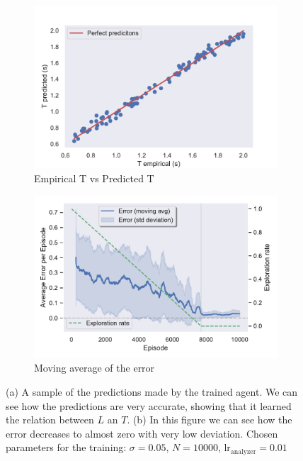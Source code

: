 \documentclass[11pt,a4paper,twoside]{report}
\newcommand{\+}{\textnormal{+} }
\theoremstyle{definition}
\numberwithin{equation}{chapter}
\begin{document}
  \begin{figure}[]
  \centering
  \begin{subfigure}{.5\textwidth}
    \centering
    \includegraphics[width=1\linewidth]{figures/Real-vs-Pred-Pendulum.pdf}
    \caption{Empirical T vs Predicted T}
    \label{fig:RealvsPredictedPendulum}
  \end{subfigure}%
  \begin{subfigure}{.5\textwidth}
    \centering
    \includegraphics[width=1\linewidth]{figures/Error-Pendulum.pdf}
    \caption{Moving average of the error}
    \label{fig:ErrorAveragePendulum}
  \end{subfigure}
  \caption{(a) A sample of the predictions made by the trained agent. We can see
  how the predictions are very accurate, showing that it learned the relation
  between $L$ an $T$. (b) In this figure we can see how the error decreases to
  almost zero with very low deviation. Chosen parameters for the training:
  $\sigma=0.05$, $N=10000$, $\text{lr}_\text{analyzer}=0.01$}
  \label{fig:PendulumError}
  \end{figure}
\end{document}
